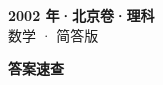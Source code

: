 \documentclass[zihao=-4, a4paper]{ctexart}
\begin{document}
\begin{center}
  {\Large\bfseries 2002 年·北京卷·理科}\\[4pt]
  {\large 数学 · 简答版}
\end{center}
\medskip
{}

\clearpage
{}
\begin{center}{\Large\bfseries 答案速查}\end{center}
\medskip

\end{document}

